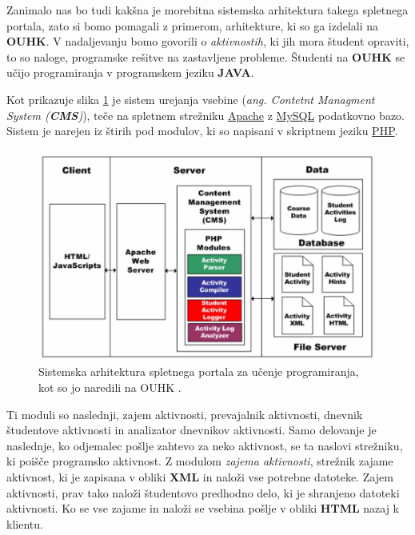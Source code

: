 Zanimalo nas bo tudi kakšna je morebitna sistemska arhitektura takega
spletnega portala, zato si bomo pomagali z primerom, arhitekture, ki
so ga izdelali na \textbf{OUHK}.  V nadaljevanju bomo govorili o
\emph{aktivnostih}, ki jih mora študent opraviti, to so naloge,
programske rešitve na zastavljene probleme. Študenti na \textbf{OUHK}
se učijo programiranja v programskem jeziku \textbf{JAVA}.

Kot prikazuje slika \ref{fig:OUHK_cmsArch} je sistem urejanja vsebine
(\emph{ang. Contetnt Managment System (\textbf{CMS})}), teče na
spletnem strežniku \href{http://www.apache.org/}{Apache} z
\href{https://www.mysql.com/}{MySQL} podatkovno bazo. Sistem je
narejen iz štirih pod modulov, ki so napisani v skriptnem jeziku
\href{http://php.net/}{PHP}.

\begin{figure}[htb!] \centering
  \includegraphics[width=0.9\linewidth, keepaspectratio =
1]{./images/SystemArch01_OUHK_DistanceEdu.jpg}
  \caption{Sistemska arhitektura spletnega portala za učenje
    programiranja, kot so jo naredili na OUHK \cite{ITaLCP_DistanceEdu}.}
  \label{fig:OUHK_cmsArch}
\end{figure}

Ti moduli so naslednji, zajem aktivnosti, prevajalnik aktivnosti,
dnevnik študentove aktivnosti in analizator dnevnikov aktivnosti. Samo
delovanje je naslednje, ko odjemalec pošlje zahtevo za neko aktivnost,
se ta naslovi strežniku, ki poišče programsko aktivnost. Z modulom
\emph{zajema aktivnosti}, strežnik zajame aktivnost, ki je zapisana v
obliki \textbf{XML} in naloži vse potrebne datoteke. Zajem aktivnosti,
prav tako naloži študentovo predhodno delo, ki je shranjeno datoteki
aktivnosti. Ko se vse zajame in naloži se vsebina pošlje v obliki
\textbf{HTML} nazaj k klientu.

